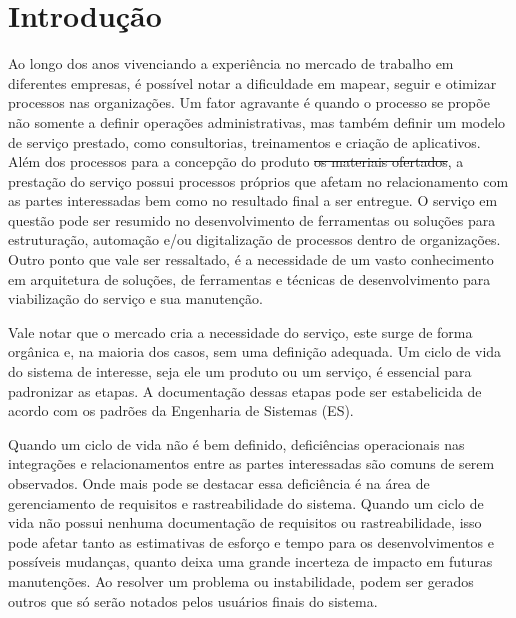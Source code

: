 
\chapter{Introdução}\label{chap:introducao} %

	Ao longo dos anos vivenciando a experiência no mercado de trabalho em diferentes 
	empresas, é possível notar a dificuldade em mapear, seguir e otimizar processos 
	nas organizações. Um fator agravante é quando o processo se propõe não somente a definir operações administrativas, mas também definir um modelo de 
	serviço prestado, {\color{blue} como consultorias, treinamentos e criação de aplicativos. Além 
	dos processos para a concepção do produto \sout{os materiais ofertados}, a prestação do 
	serviço possui processos próprios que afetam no relacionamento com as partes interessadas
	bem como no resultado final a ser entregue.} O serviço em questão pode ser resumido no desenvolvimento de 
	ferramentas ou soluções para estruturação, automação e/ou digitalização de processos dentro 
	de organizações. Outro ponto que vale ser ressaltado, é a necessidade de um vasto conhecimento 
	em arquitetura de soluções, de ferramentas e técnicas de desenvolvimento para 
	viabilização do serviço e sua manutenção.

	Vale notar que o mercado cria a necessidade do serviço, este 
	surge de forma orgânica e, na maioria dos casos, sem uma definição adequada. Um ciclo 
	de vida do sistema de interesse, seja ele um produto ou um serviço, é essencial para 
	padronizar as etapas. A documentação dessas etapas pode ser estabelicida de acordo com 
	os padrões da Engenharia de Sistemas (ES). 
	
	Quando um ciclo de vida não é bem definido, deficiências operacionais nas integrações 
	e relacionamentos entre as partes interessadas são comuns de serem observados. 
	Onde mais pode se destacar essa deficiência é na área de gerenciamento de requisitos e 
	rastreabilidade do sistema. Quando um ciclo de vida não possui nenhuma documentação de 
	requisitos ou rastreabilidade, isso pode afetar tanto as estimativas de esforço e tempo 
	para os desenvolvimentos e possíveis mudanças, quanto deixa uma grande incerteza de impacto 
	em futuras manutenções. Ao resolver um problema ou instabilidade, podem ser gerados outros 
	que só serão notados pelos usuários finais do sistema.
	
